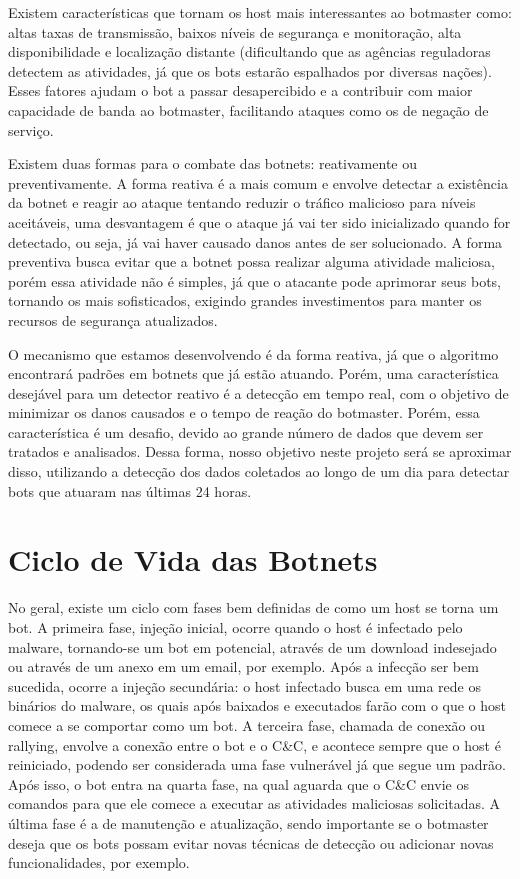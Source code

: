 Existem características que tornam os host mais interessantes ao botmaster como: altas taxas de transmissão, baixos níveis de segurança e monitoração, alta disponibilidade e localização distante (dificultando que as agências reguladoras detectem as atividades, já que os bots estarão espalhados por diversas nações). Esses fatores ajudam o bot a passar desapercibido e a contribuir com maior capacidade de banda ao botmaster, facilitando ataques como os de negação de serviço.

Existem duas formas para o combate das botnets: reativamente ou preventivamente. A forma reativa é a mais comum e envolve detectar a existência da botnet e reagir ao ataque tentando reduzir o tráfico malicioso para níveis aceitáveis, uma desvantagem é que o ataque já vai ter sido inicializado quando for detectado, ou seja, já vai haver causado danos antes de ser solucionado. A forma preventiva busca evitar que a botnet possa realizar alguma atividade maliciosa, porém essa atividade não é simples, já que o atacante pode aprimorar seus bots, tornando os mais sofisticados, exigindo grandes investimentos para manter os recursos de segurança atualizados.

O mecanismo que estamos desenvolvendo é da forma reativa, já que o algoritmo encontrará padrões em botnets que já estão atuando. Porém, uma característica desejável para um detector reativo é a detecção em tempo real, com o objetivo de minimizar os danos causados e o tempo de reação do botmaster. Porém, essa característica é um desafio, devido ao grande número de dados que devem ser tratados e analisados. Dessa forma, nosso objetivo neste projeto será se aproximar disso, utilizando a detecção dos dados coletados ao longo de um dia para detectar bots que atuaram nas últimas 24 horas.

\section{Ciclo de Vida das Botnets}
No geral, existe um ciclo com fases bem definidas de como um host se torna um bot. A primeira fase, injeção inicial, ocorre quando o host é infectado pelo malware, tornando-se um bot em potencial, através de um download indesejado ou através de um anexo em um email, por exemplo. Após a infecção ser bem sucedida, ocorre a injeção secundária: o host infectado busca em uma rede os binários do malware, os quais após baixados e executados farão com o que o host comece a se comportar como um bot. A terceira fase, chamada de conexão ou rallying, envolve a conexão entre o bot e o C\&C, e acontece sempre que o host é reiniciado, podendo ser considerada uma fase vulnerável já que segue um padrão. Após isso, o bot entra na quarta fase, na qual aguarda que o C\&C envie os comandos para que ele comece a executar as atividades maliciosas solicitadas. A última fase é a de manutenção e atualização, sendo importante se o botmaster deseja que os bots possam evitar novas técnicas de detecção ou adicionar novas funcionalidades, por exemplo.

